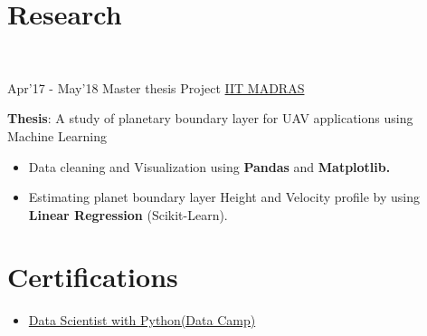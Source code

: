 \documentclass[letterpaper]{twentysecondcv} %
\begin{document}
\section{Research}\\
    \begin{twenty}
    	\twentyitem
        	{Apr'17 -}
    		{May'18}
            {Master thesis Project}
            {\href{https://www.iitm.ac.in/}{IIT MADRAS}}
            {}
            {
           	\textbf{Thesis}:  A study of planetary boundary layer for UAV applications using Machine Learning
            {\begin{itemize}
            \item Data cleaning and Visualization using \textbf{Pandas} and \textbf{Matplotlib.}
            \item Estimating planet boundary layer Height and Velocity profile by using \textbf{Linear Regression} (Scikit-Learn).
    		\end{itemize}}
            }
    \end{twenty}
\section{Certifications}
    \begin{itemize}
        \item \href{https://www.datacamp.com/statement-of-accomplishment/track/fe7ff221d988f6f80654feb00c9e63bf496182ab}{Data Scientist with Python(Data Camp)}
    \end{itemize}
\end{document}

